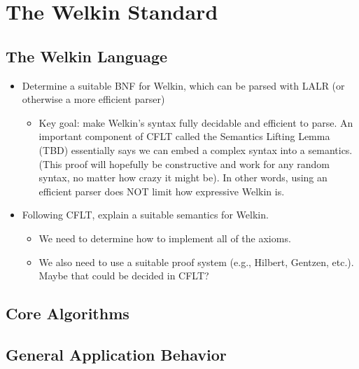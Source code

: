 \chapter{The Welkin Standard}

\section{The Welkin Language}

\begin{itemize}
  \item Determine a suitable BNF for Welkin, which can be parsed with LALR (or otherwise a more efficient parser)
  \begin{itemize}
    \item Key goal: make Welkin's syntax fully decidable and efficient to parse. An important component of CFLT called the Semantics Lifting Lemma (TBD) essentially says we can embed a complex syntax into a semantics. (This proof will hopefully be constructive and work for any random syntax, no matter how crazy it might be). In other words, using an efficient parser does NOT limit how expressive Welkin is.
  \end{itemize}
  \item Following CFLT, explain a suitable semantics for Welkin.
        \begin{itemize}
          \item We need to determine how to implement all of the axioms.
          \item We also need to use a suitable proof system (e.g., Hilbert, Gentzen, etc.). Maybe that could be decided in CFLT?
        \end{itemize}
\end{itemize}

\section{Core Algorithms}

\section{General Application Behavior}

\label{ch:spec}
